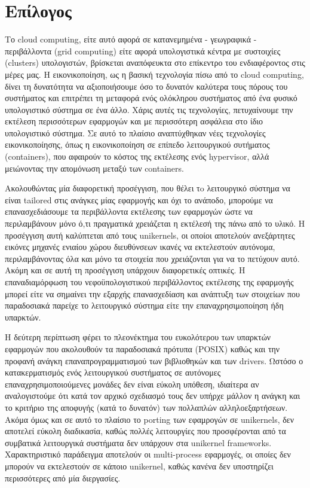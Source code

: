 \chapter{Επίλογος}
\label{chap:conclusion}
Το cloud computing, είτε αυτό αφορά σε κατανεμημένα - γεωγραφικά - περιβάλλοντα
(grid computing) είτε αφορά υπολογιστικά κέντρα με συστοιχίες (clusters)
υπολογιστών, βρίσκεται αναπόφευκτα στο επίκεντρο του ενδιαφέροντος στις μέρες
μας. Η εικονικοποίηση, ως η βασική τεχνολογία πίσω από το cloud computing, δίνει
τη δυνατότητα να αξιοποιήσουμε όσο το δυνατόν καλύτερα τους πόρους του
συστήματος και επιτρέπει τη μεταφορά ενός ολόκληρου συστήματος από ένα φυσικό
υπολογιστικό σύστημα σε ένα άλλο. Χάρις αυτές τις τεχνολογίες, πετυχαίνουμε την
εκτέλεση περισσότερων εφαρμογών και με περισσότερη ασφάλεια στο ίδιο
υπολογιστικό σύστημα. Σε αυτό το πλαίσιο αναπτύχθηκαν νέες τεχνολογίες
εικονικοποίησης, όπως η εικονικοποίηση σε επίπεδο λειτουργικού συτήματος
(containers), που αφαιρούν το κόστος της εκτέλεσης ενός hypervisor, αλλά
μειώνοντας την απομόνωση μεταξύ των containers.


Ακολουθώντας μία διαφορετική προσέγγιση, που θέλει τo λειτουργικό σύστημα να
είναι tailored στις ανάγκες μίας εφαρμογής και όχι το ανάποδο, μπορούμε να
επανασχεδιάσουμε τα περιβάλλοντα εκτέλεσης των εφαρμογών ώστε να περιλαμβάνουν
μόνο ό,τι πραγματικά χρειάζεται η εκτέλεσή της πάνω από το υλικό. Η προσέγγιση
αυτή καλύπτεται από τους unikernels, οι οποίοι αποτελούν ανεξάρτητες εικόνες μηχανές
ενιαίου χώρου διευθύνσεων ικανές να εκτελεστούν αυτόνομα, περιλαμβάνοντας όλα
και μόνο τα στοιχεία που χρειάζονται για να το πετύχουν αυτό. Ακόμη και σε αυτή
τη προσέγγιση υπάρχουν διαφορετικές οπτικές. Η επαναδιαμόρφωση του
νεφοϋπολογιστικού περιβάλλοντος εκτέλεσης της εφαρμογής μπορεί είτε να σημαίνει
την εξαρχής επανασχεδίαση και ανάπτυξη των στοιχείων που παραδοσιακά παρείχε το
λειτουργικό σύστημα είτε την επαναχρησιμοποίηση ήδη υπαρκτών.

Η δεύτερη περίπτωση φέρει το πλεονέκτημα του ευκολότερου  των υπαρκτών
εφαρμογών που ακολουθούν τα παραδοσιακά πρότυπα (POSIX) καθώς και την προφανή
ανάγκη επαναπρογραμματισμού των βιβλιοθηκών και των drivers. Ωστόσο ο
κατακερματισμός ενός λειτουργικού συστήματος σε αυτόνομες επαναχρησιμοποιούμενες
μονάδες δεν είναι εύκολη υπόθεση, ιδιαίτερα αν αναλογιστούμε ότι κατά τον αρχικό
σχεδιασμό τους δεν υπήρχε μάλλον η ανάγκη και το κριτήριο της αποφυγής (κατά το
δυνατόν) των πολλαπλών αλληλοεξαρτήσεων. Ακόμα όμως και σε αυτό το πλαίσιο το
porting των εφαμρογών σε unikernels, δεν αποτελεί εύκολη διαδικασία, καθώς πολλές
λειτουργίες που προσφέρονται από τα συμβατικά λειτουργικά συστήματα δεν υπάρχουν
στα unikernel frameworks. Χαρακτηριστικό παράδειγμα αποτελούν οι multi-process
εφαρμογές, οι οποίες δεν μπορούν να εκτελεστούν σε κάποιο unikernel, καθώς
κανένα δεν υποστηρίζει περισσότερες από μία διεργασίες.

